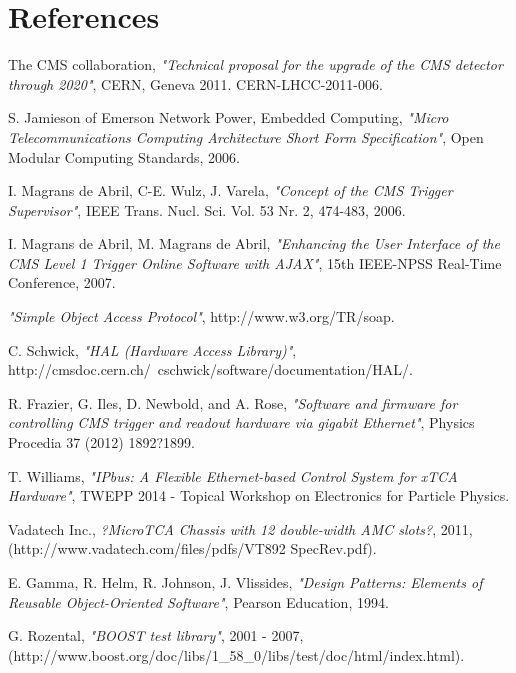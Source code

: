 \documentclass[a4paper]{jpconf}
\begin{document}
\section*{References}
\begin{thebibliography}{11}

 The CMS collaboration, \emph{"Technical proposal for the upgrade of the CMS detector through 2020"}, CERN, Geneva 2011. CERN-LHCC-2011-006. 

 S. Jamieson of Emerson Network Power, Embedded Computing, \emph{"Micro Telecommunications Computing Architecture Short Form Specification"}, Open Modular Computing Standards, 2006.

 I. Magrans de Abril, C-E. Wulz, J. Varela, \emph{"Concept of the CMS Trigger Supervisor"}, IEEE Trans. Nucl. Sci. Vol. 53 Nr. 2, 474-483, 2006.
  
 I. Magrans de Abril, M. Magrans de Abril, \emph{"Enhancing the User Interface of the CMS Level 1 Trigger Online Software with AJAX"}, 15th IEEE-NPSS Real-Time Conference, 2007.
  
 \emph{"Simple Object Access Protocol"}, http://www.w3.org/TR/soap.
  
 C. Schwick, \emph{"HAL (Hardware Access Library)"}, http://cmsdoc.cern.ch/~cschwick/software/documentation/HAL/.
  
 R. Frazier, G. Iles, D. Newbold, and A. Rose, \emph{"Software and firmware for controlling CMS trigger and readout hardware via gigabit Ethernet"}, Physics Procedia 37 (2012) 1892?1899.
  
 T. Williams, \emph{"IPbus: A Flexible Ethernet-based Control System for xTCA Hardware"}, TWEPP 2014 - Topical Workshop on Electronics for Particle Physics.
  
 Vadatech Inc., \emph{?MicroTCA Chassis with 12 double-width AMC slots?}, 2011, (http://www.vadatech.com/files/pdfs/VT892 SpecRev.pdf).
  
 E. Gamma, R. Helm, R. Johnson, J. Vlissides, \emph{"Design Patterns: Elements of Reusable Object-Oriented Software"}, Pearson Education, 1994.
  
 G. Rozental, \emph{"BOOST test library"}, 2001 - 2007, (http://www.boost.org/doc/libs/1\_58\_0/libs/test/doc/html/index.html).

\end{thebibliography}
\end{document}
